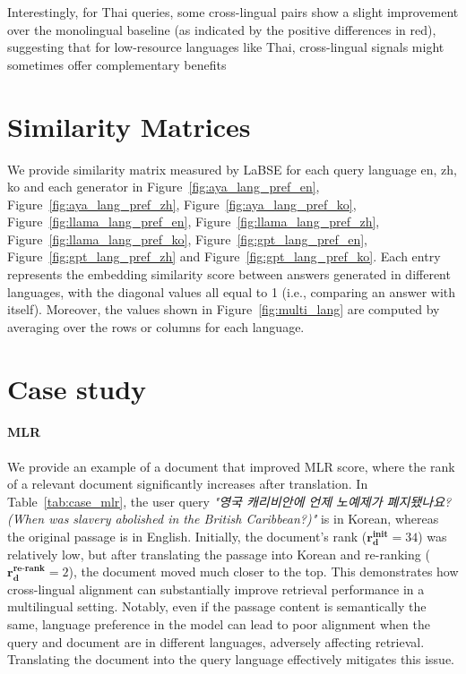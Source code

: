 Interestingly, for Thai queries, some cross-lingual pairs show a slight improvement over the monolingual baseline (as indicated by the positive differences in red), suggesting that for low-resource languages like Thai, cross-lingual signals might sometimes offer complementary benefits



\section{Similarity Matrices}
We provide similarity matrix measured by LaBSE for each query language en, zh, ko and each generator in Figure~\ref{fig:aya_lang_pref_en}, Figure~\ref{fig:aya_lang_pref_zh}, Figure~\ref{fig:aya_lang_pref_ko}, Figure~\ref{fig:llama_lang_pref_en}, Figure~\ref{fig:llama_lang_pref_zh}, Figure~\ref{fig:llama_lang_pref_ko}, Figure~\ref{fig:gpt_lang_pref_en}, Figure~\ref{fig:gpt_lang_pref_zh} and Figure~\ref{fig:gpt_lang_pref_ko}. Each entry represents the embedding similarity score between answers generated in different languages, with the diagonal values all equal to 1 (i.e., comparing an answer with itself). Moreover, the values shown in Figure~\ref{fig:multi_lang} are computed by averaging over the rows or columns for each language.


\section{Case study}
\paragraph{MLR}
We provide an example of a document that improved MLR score, where the rank of a relevant document significantly increases after translation. In Table~\ref{tab:case_mlr}, the user query \textit{"영국 캐리비안에 언제 노예제가 폐지됐나요? (When was slavery abolished in the British Caribbean?)"} is in Korean, whereas the original passage is in English. Initially, the document’s rank (\(\mathbf{r_d^{\text{init}}} = 34\)) was relatively low, but after translating the passage into Korean and re-ranking (\(\mathbf{r_d^{\text{re-rank}}} = 2\)), the document moved much closer to the top. 
This demonstrates how cross-lingual alignment can substantially improve retrieval performance in a multilingual setting.
Notably, even if the passage content is semantically the same, language preference in the model can lead to poor alignment when the query and document are in different languages, adversely affecting retrieval. Translating the document into the query language effectively mitigates this issue.


